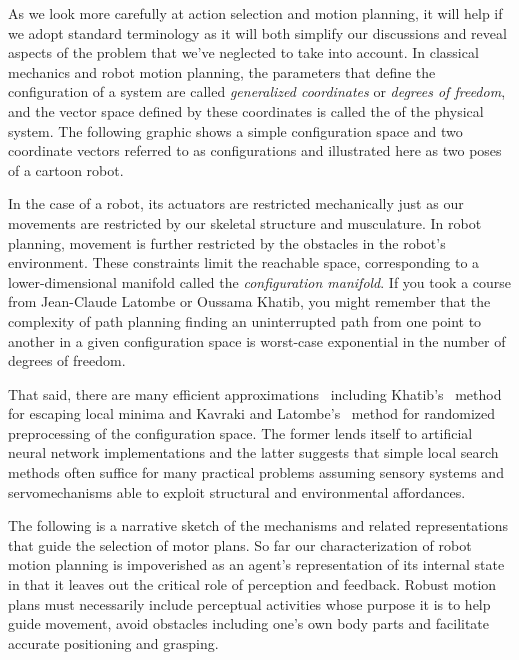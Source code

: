 
As we look more carefully at action selection and motion planning, it will help if we adopt standard terminology as it will both simplify our discussions and reveal aspects of the problem that we've neglected to take into account. In classical mechanics and robot motion planning, the parameters that define the configuration of a system are called {\it{generalized coordinates}} or {\it{degrees of freedom}}, and the vector space defined by these coordinates is called the {} of the physical system. The following graphic shows a simple configuration space and two coordinate vectors referred to as configurations and illustrated here as two poses of a cartoon robot.

In the case of a robot, its actuators are restricted mechanically just as our movements are restricted by our skeletal structure and musculature. In robot planning, movement is further restricted by the obstacles in the robot's environment. These constraints limit the reachable space, corresponding to a lower-dimensional manifold called the {\it{configuration manifold}}. If you took a course from Jean-Claude Latombe or Oussama Khatib, you might remember that the complexity of path planning {\emdash{}} finding an uninterrupted path from one point to another in a given configuration space {\emdash{}} is worst-case exponential in the number of degrees of freedom.

That said, there are many efficient approximations~\cite{Latombe90} including Khatib's~\cite{KhatibIJRR-86} {} method for escaping local minima and Kavraki and Latombe's~\cite{KavrakiandLatombeIEEE-94} method for randomized preprocessing of the configuration space. The former lends itself to artificial neural network implementations and the latter suggests that simple local search methods often suffice for many practical problems assuming sensory systems and servomechanisms able to exploit structural and environmental affordances.

The following is a narrative sketch of the mechanisms and related representations that guide the selection of motor plans. So far our characterization of robot motion planning is impoverished as an agent's representation of its internal state in that it leaves out the critical role of perception and feedback. Robust motion plans must necessarily include perceptual activities whose purpose it is to help guide movement, avoid obstacles including one's own body parts and facilitate accurate positioning and grasping.      

